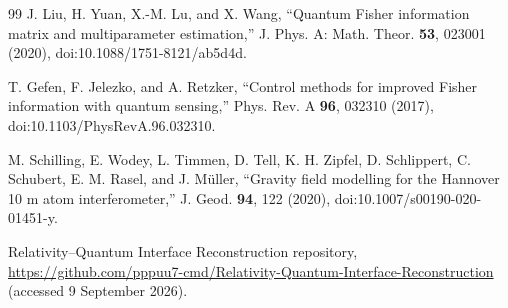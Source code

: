 \begin{thebibliography}{99}
J. Liu, H. Yuan, X.-M. Lu, and X. Wang,
``Quantum Fisher information matrix and multiparameter estimation,''
J. Phys. A: Math. Theor. \textbf{53}, 023001 (2020),
doi:10.1088/1751-8121/ab5d4d.

T. Gefen, F. Jelezko, and A. Retzker,
``Control methods for improved Fisher information with quantum sensing,''
Phys. Rev. A \textbf{96}, 032310 (2017),
doi:10.1103/PhysRevA.96.032310.

M. Schilling, E. Wodey, L. Timmen, D. Tell, K. H. Zipfel,
D. Schlippert, C. Schubert, E. M. Rasel, and J. M\"uller,
``Gravity field modelling for the Hannover 10 m atom interferometer,''
J. Geod. \textbf{94}, 122 (2020),
doi:10.1007/s00190-020-01451-y.

Relativity--Quantum Interface Reconstruction repository,
\url{https://github.com/pppuu7-cmd/Relativity-Quantum-Interface-Reconstruction}
(accessed 9 September 2026).

\end{thebibliography}
